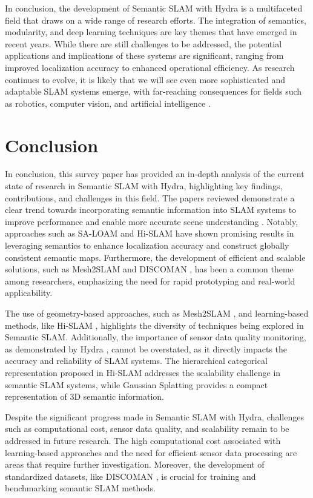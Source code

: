 \documentclass[conference]{IEEEtran}
\begin{document}
In conclusion, the development of Semantic SLAM with Hydra is a multifaceted field that draws on a wide range of research efforts. The integration of semantics, modularity, and deep learning techniques are key themes that have emerged in recent years. While there are still challenges to be addressed, the potential applications and implications of these systems are significant, ranging from improved localization accuracy to enhanced operational efficiency. As research continues to evolve, it is likely that we will see even more sophisticated and adaptable SLAM systems emerge, with far-reaching consequences for fields such as robotics, computer vision, and artificial intelligence \cite{b6}.

\section{Conclusion}
In conclusion, this survey paper has provided an in-depth analysis of the current state of research in Semantic SLAM with Hydra, highlighting key findings, contributions, and challenges in this field. The papers reviewed demonstrate a clear trend towards incorporating semantic information into SLAM systems to improve performance and enable more accurate scene understanding \cite{b1}. Notably, approaches such as SA-LOAM \cite{b2} and Hi-SLAM \cite{b3} have shown promising results in leveraging semantics to enhance localization accuracy and construct globally consistent semantic maps. Furthermore, the development of efficient and scalable solutions, such as Mesh2SLAM \cite{b4} and DISCOMAN \cite{b5}, has been a common theme among researchers, emphasizing the need for rapid prototyping and real-world applicability.

The use of geometry-based approaches, such as Mesh2SLAM \cite{b4}, and learning-based methods, like Hi-SLAM \cite{b3}, highlights the diversity of techniques being explored in Semantic SLAM. Additionally, the importance of sensor data quality monitoring, as demonstrated by Hydra \cite{b6}, cannot be overstated, as it directly impacts the accuracy and reliability of SLAM systems. The hierarchical categorical representation proposed in Hi-SLAM \cite{b3} addresses the scalability challenge in semantic SLAM systems, while Gaussian Splatting \cite{b3} provides a compact representation of 3D semantic information.

Despite the significant progress made in Semantic SLAM with Hydra, challenges such as computational cost, sensor data quality, and scalability remain to be addressed in future research. The high computational cost associated with learning-based approaches \cite{b3} and the need for efficient sensor data processing \cite{b4} are areas that require further investigation. Moreover, the development of standardized datasets, like DISCOMAN \cite{b5}, is crucial for training and benchmarking semantic SLAM methods.
\end{document}
